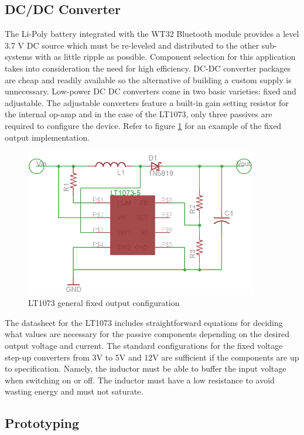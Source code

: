 \subsection{DC/DC Converter}

The Li-Poly battery integrated with the WT32 Bluetooth \textregistered module provides a level 3.7 V DC source which must be re-leveled and distributed to the other sub-systems with as little ripple as possible. Component selection for this application takes into consideration the need for high efficiency. DC-DC converter packages are cheap and readily available so the alternative of building a custom supply is unnecessary. Low-power DC DC converters come in two basic varieties: fixed and adjustable. The adjustable converters feature a built-in gain setting resistor for the internal op-amp and in the case of the LT1073, only three passives are required to configure the device. Refer to figure \ref{fig:general step-up} for an example of the fixed output implementation.

\begin{figure}[hbp]
\centering
\includegraphics[width=4in]{../drawings/power_gen_fixed.png}
\caption[LT1073 Fixed Output Configuration]{LT1073 general fixed output configuration\cite{ds:lt1073}}
\label{fig:general step-up}
\end{figure}

The datasheet for the LT1073 includes straightforward equations for deciding what values are necessary for the passive components depending on the desired output voltage and current. The standard configurations for the fixed voltage step-up converters from 3V to 5V and 12V are sufficient if the components are up to specification. Namely, the inductor must be able to buffer the input voltage when switching on or off. The inductor must have a low resistance to avoid wasting energy and must not saturate. 

\subsection{Prototyping}

